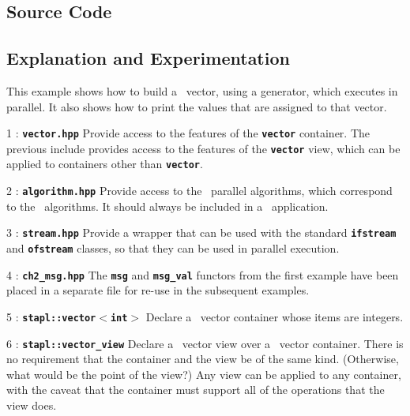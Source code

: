 \documentclass{report}
\begin{document}
\subsection{Source Code}




\subsection{Explanation and Experimentation}

This example shows how to build a \stapl\ vector, using a generator,
which executes in parallel.
It also shows how to print the values that are assigned to that vector.

\begin{hashitemize}
\item 1 : \texttt{{\bf vector.hpp}}
\newline
Provide access to the features of the
\texttt{{\bf vector}}
container.
The previous include provides access to the features of the
\texttt{{\bf vector}}
view, which can be applied to containers other than
\texttt{{\bf vector}}.

\item 2 : \texttt{{\bf algorithm.hpp}}
\newline
Provide access to the \stapl\ parallel algorithms, which
correspond to the \stl\ algorithms.  It should always be included in a
\stapl\ application.

\item 3 : \texttt{{\bf stream.hpp}}
\newline
Provide a wrapper that can be used with the standard
\texttt{{\bf ifstream}}
and
\texttt{{\bf ofstream}}
classes,
so that they can be used in parallel execution.

\item 4 : \texttt{{\bf ch2\_msg.hpp}}
\newline
The
\texttt{{\bf msg}}
and
\texttt{{\bf msg\_val}}
functors
from the first example have been placed in a separate file
for re-use in the subsequent examples.

\item 5 : \texttt{{\bf stapl::vector$<$int$>$}}
\newline
Declare a \stapl\ vector container whose items are integers.

\item 6 : \texttt{{\bf stapl::vector\_view}}
\newline
Declare a \stapl\ vector view over a \stapl\ vector container.
There is no requirement that the container and the view be of the same kind.
(Otherwise, what would be the point of the view?)
Any view can be applied to any container, with the caveat that the
container must support all of the operations that the view does.


\end{hashitemize}
\end{document}
